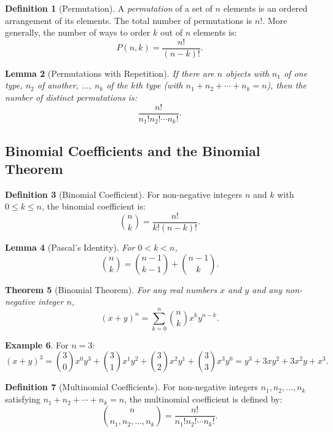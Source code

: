 \documentclass[12pt]{article}
\newtheorem{theorem}{Theorem}[section]
\newtheorem{lemma}[theorem]{Lemma}
\theoremstyle{definition}
\newtheorem{definition}[theorem]{Definition}
\newtheorem{example}[theorem]{Example}
\begin{document}
\begin{definition}[Permutation]
  A \emph{permutation} of a set of \(n\) elements is an ordered arrangement of its elements. The total number of permutations is \(n!\). More generally, the number of ways to order \(k\) out of \(n\) elements is:
  \[
  P(n,k) = \frac{n!}{(n-k)!}.
  \]
\end{definition}

\begin{lemma}[Permutations with Repetition]
  If there are \(n\) objects with \(n_1\) of one type, \(n_2\) of another, \(\dots\), \(n_k\) of the \(k\)th type (with \(n_1+n_2+\cdots+n_k = n\)), then the number of distinct permutations is:
  \[
  \frac{n!}{n_1!n_2!\cdots n_k!}.
  \]
\end{lemma}

\subsection{Binomial Coefficients and the Binomial Theorem}

\begin{definition}[Binomial Coefficient]
  For non-negative integers \(n\) and \(k\) with \(0 \le k \le n\), the binomial coefficient is:
  \[
  \binom{n}{k} = \frac{n!}{k!(n-k)!}.
  \]
\end{definition}

\begin{lemma}[Pascal's Identity]
  For \(0 < k < n\),
  \[
  \binom{n}{k} = \binom{n-1}{k-1} + \binom{n-1}{k}.
  \]
\end{lemma}

\begin{theorem}[Binomial Theorem]
  For any real numbers \(x\) and \(y\) and any non-negative integer \(n\),
  \[
  (x+y)^n = \sum_{k=0}^{n} \binom{n}{k} x^k y^{n-k}.
  \]
\end{theorem}

\begin{example}
  For \(n=3\):
  \[
  (x+y)^3 = \binom{3}{0}x^0y^3 + \binom{3}{1}x^1y^2 + \binom{3}{2}x^2y^1 + \binom{3}{3}x^3y^0 = y^3 + 3xy^2 + 3x^2y + x^3.
  \]
\end{example}

\begin{definition}[Multinomial Coefficients]
  For non-negative integers \(n_1, n_2, \dots, n_k\) satisfying \(n_1+n_2+\cdots+n_k = n\), the multinomial coefficient is defined by:
  \[
  \binom{n}{n_1, n_2, \dots, n_k} = \frac{n!}{n_1!n_2!\cdots n_k!}.
  \]
\end{definition}
\end{document}
